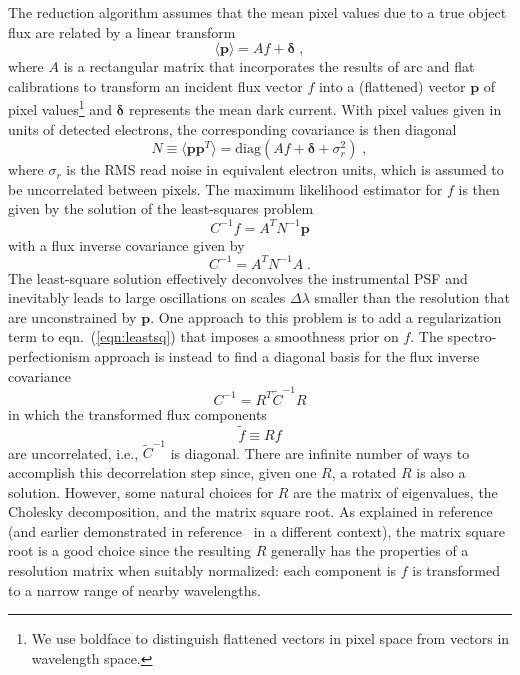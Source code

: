 \documentclass[12pt]{article}
\providecommand{\eqn}[1]{eqn.~(\ref{eqn:#1})}
\providecommand{\vecsymbol}[1]{\ensuremath{\boldsymbol{#1}}}
\providecommand{\pv}{\vecsymbol{p}}
\providecommand{\deltav}{\vecsymbol{\delta}}
\begin{document}
The reduction algorithm assumes that the mean pixel values due to a true object flux are related by a linear transform
\begin{equation}
\langle \pv \rangle = A f + \deltav \; ,
\end{equation}
where $A$ is a rectangular matrix that incorporates the results of arc and flat calibrations to transform an incident flux vector $f$ into a (flattened) vector $\pv$ of pixel values\footnote{We use boldface to distinguish flattened vectors in pixel space from vectors in wavelength space.} and $\deltav$ represents the mean dark current. With pixel values given in units of detected electrons, the corresponding covariance is then diagonal
\begin{equation}
N \equiv \langle\pv \pv^T\rangle = \text{diag}\left( A f + \deltav + \sigma^2_{r} \right) \; ,
\end{equation}
where $\sigma_r$ is the RMS read noise in equivalent electron units, which is assumed to be uncorrelated between pixels. The maximum likelihood estimator for $f$ is then given by the solution of the least-squares problem
\begin{equation}
C^{-1} f = A^T N^{-1} \pv
\label{eqn:leastsq}
\end{equation}
with a flux inverse covariance given by
\begin{equation}
C^{-1} = A^T N^{-1} A \; .
\end{equation}
The least-square solution effectively deconvolves the instrumental PSF and inevitably leads to large oscillations on scales $\Delta\lambda$ smaller than the resolution that are unconstrained by $\pv$. One approach to this problem is to add a regularization term to \eqn{leastsq} that imposes a smoothness prior on $f$.  The spectro-perfectionism approach is instead to find a diagonal basis for the flux inverse covariance
\begin{equation}
C^{-1} = R^T \tilde{C}^{-1} R
\end{equation}
in which the transformed flux components
\begin{equation}
\tilde{f} \equiv R f
\end{equation}
are uncorrelated, i.e., $\tilde{C}^{-1}$ is diagonal.  There are infinite number of ways to accomplish this decorrelation step since, given one $R$, a rotated $R$ is also a solution. However, some natural choices for $R$ are the matrix of eigenvalues, the Cholesky decomposition, and the matrix square root. As explained in reference~\cite{2010PASP..122..248B} (and earlier demonstrated in reference~\cite{2000MNRAS.312..285H} in a different context), the matrix square root is a good choice since the resulting $R$ generally has the properties of a resolution matrix when suitably normalized: each component is $f$ is transformed to a narrow range of nearby wavelengths.
\end{document}
